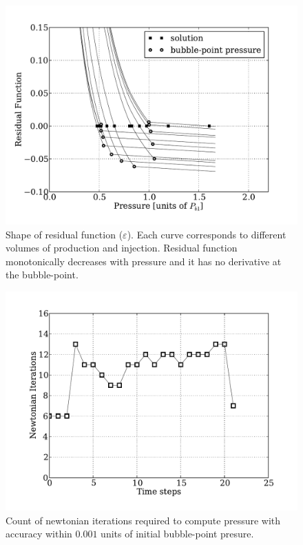 \documentclass[authoryear,preprint,review,11pt]{elsarticle}
\begin{document}
\begin{figure}
\centering
\includegraphics[width=\linewidth]{./python/matbal_res}
\caption{Shape of residual function ($\varepsilon$). Each curve corresponds to different volumes of production and injection. Residual function monotonically decreases with pressure and it has no derivative at the bubble-point.}
\label{fig: epsilon}
\end{figure}

\begin{figure}
\centering
\includegraphics[width=\linewidth]{./python/matbal_iter}
\caption{Count of newtonian iterations required to compute pressure with accuracy within $0.001$ units of initial bubble-point presure.}
\label{fig: iter}
\end{figure}
\end{document}
